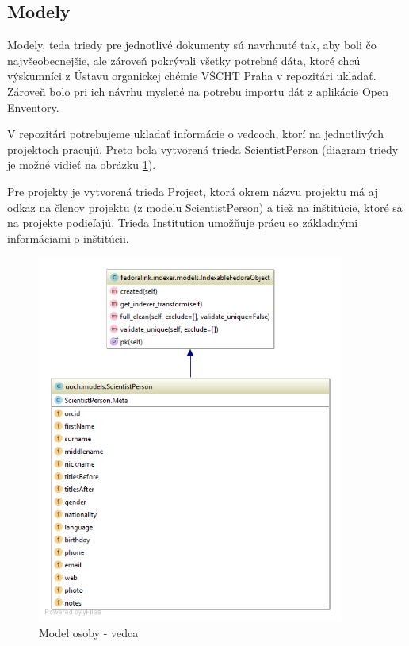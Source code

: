 \documentclass[thesis=M,slovak]{FITthesis}[2013/05/06]
\begin{document}
\subsection{Modely}
Modely, teda triedy pre jednotlivé dokumenty sú navrhnuté tak, aby boli čo najvšeobecnejšie, ale zároveň pokrývali všetky potrebné dáta, ktoré chcú výskumníci z Ústavu organickej chémie VŠCHT Praha v repozitári ukladať. Zároveň bolo pri ich návrhu myslené na potrebu importu dát z aplikácie Open Enventory.

V repozitári potrebujeme ukladať informácie o vedcoch, ktorí na jednotlivých projektoch pracujú. Preto bola vytvorená trieda ScientistPerson (diagram triedy je možné vidieť na obrázku \ref{graphics:ScientistPerson}).

Pre projekty je vytvorená trieda Project, ktorá okrem názvu projektu má aj odkaz na členov projektu (z modelu ScientistPerson) a tiež na inštitúcie, ktoré sa na projekte podieľajú. Trieda Institution umožňuje prácu so základnými informáciami o inštitúcii.

\begin{figure}\centering
	\includegraphics[width=0.9\textwidth]{diagramy/UOCH_ScientistPerson.png}
 	\caption[Model osoby - vedca]{Model osoby - vedca}\label{graphics:ScientistPerson}
\end{figure}
\end{document}
